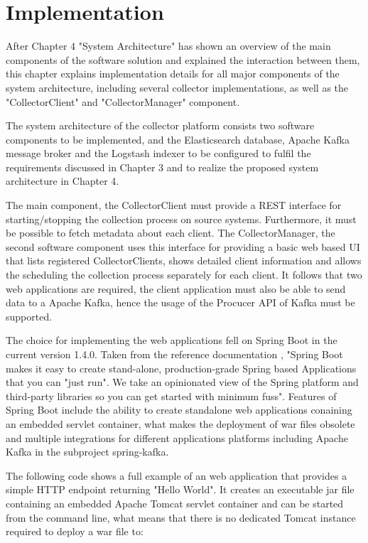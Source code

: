 \chapter{Implementation}

After Chapter 4 "System Architecture" has shown an overview of the main components of
the software solution and explained the interaction between them, this chapter explains implementation
details for all major components of the system architecture, including several
collector implementations, as well as the "CollectorClient" and "CollectorManager" component.

The system architecture of the collector platform consists two software components to
be implemented, and the Elasticsearch database, Apache Kafka message broker and the Logstash indexer to be configured to fulfil the
requirements discussed in Chapter 3 and to realize the proposed system architecture in Chapter 4.

The main component, the CollectorClient must provide a REST interface for starting/stopping the collection process
on source systems. Furthermore, it must be possible to fetch metadata about each client. The CollectorManager,
the second software component uses this interface for providing a basic web based UI that lists registered
CollectorClients, shows detailed client information and allows the scheduling the collection process separately
for each client. It follows that two web applications are required, the client application must also be able to
send data to a Apache Kafka, hence the usage of the Procucer API of Kafka must be supported.

The choice for implementing the web applications fell on Spring Boot in the current version 1.4.0. Taken from
the reference documentation \cite{SpringB16}, "Spring Boot makes it easy to create stand-alone, production-grade
Spring based Applications that you can "just run". We take an opinionated view of the Spring platform and
third-party libraries so you can get started with minimum fuss". Features of Spring Boot include the ability to create
standalone web applications conaining an embedded servlet container, what makes the deployment of war files obsolete
and multiple integrations for different applications platforms including Apache Kafka in the subproject spring-kafka.

The following code shows a full example of an web application that provides a simple
HTTP endpoint returning "Hello World". It creates an executable jar file containing
an embedded Apache Tomcat servlet container and can be started from the command line, what means that there is no
dedicated Tomcat instance required to deploy a war file to:

